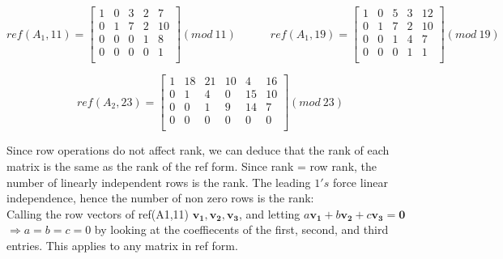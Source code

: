\documentclass[10pt,a4paper]{report}
\begin{document}
\begin{equation*}
ref(A_1,11)=\begin{bmatrix}
1 & 0 & 3 & 2 & 7 \\
0 & 1 & 7 & 2 & 10\\
0 & 0 & 0 & 1 & 8\\
0 & 0 & 0 & 0 & 1\\
\end{bmatrix} (mod \: 11)
\quad \quad \quad
ref(A_1,19)=\begin{bmatrix}
1 & 0 & 5 & 3 & 12 \\
0 & 1 & 7 & 2 & 10\\
0 & 0 & 1 & 4 & 7\\
0 & 0 & 0 & 1 & 1\\
\end{bmatrix} (mod \: 19)
\end{equation*}

\vspace{5mm}

\begin{equation*}
ref(A_2,23)=\begin{bmatrix}
1 & 18 & 21 & 10 & 4 & 16\\
0 & 1 & 4 & 0 & 15 & 10\\
0 & 0 & 1 & 9 & 14 & 7\\
0 & 0 & 0 & 0 & 0 & 0\\
\end{bmatrix} (mod \: 23)
\end{equation*}

\vspace{5mm}

Since row operations do not affect rank, we can deduce that the rank of each matrix is the same as the rank of the ref form. Since rank = row rank, the number of linearly independent rows is the rank. The leading $1's$ force linear independence, hence the number of non zero rows is the rank:\\

Calling the row vectors of ref(A1,11) $\bm{v_1}, \bm{v_2}, \bm{v_3}$, and letting $a\bm{v_1} + b\bm{v_2} + c\bm{v_3} = \bm{0}$ $\Rightarrow a=b=c=0$ by looking at the coeffiecents of the first, second, and third entries. This applies to any matrix in ref form. \\

%
\end{document}
